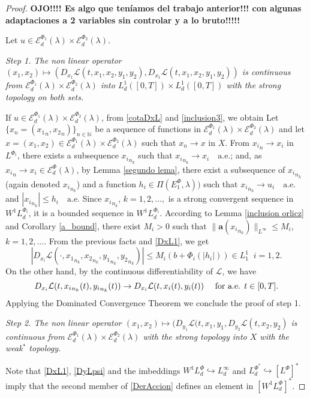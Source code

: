 \documentclass[twoside]{article}
\theoremstyle{remark}
\newcommand{\lphi}{L^{\Phi}}
\newcommand{\lphii}{L^{\Phi_i}}
\newcommand{\lpsi}{L^{\Phi^*}}
\newcommand{\ephi}{E^{\Phi}}
\newcommand{\wphi}{W^{1}\lphi}
\newcommand{\wphii}{W^{1}\lphii}
\newcommand{\domi}{\mathcal{E}^{\Phi}_d(\lambda)}
\newcommand{\domiuno}{\mathcal{E}^{\Phi_1}_d(\lambda)}
\newcommand{\domidos}{\mathcal{E}^{\Phi_2}_d(\lambda)}
\renewcommand{\b}[1]{\boldsymbol{#1}}
\renewcommand{\leq}{\leqslant}
\begin{document}
\begin{proof} 

{\bf OJO!!!! Es algo que ten\'iamos del trabajo anterior!!! 
con algunas adaptaciones a 2 variables sin controlar y a lo bruto!!!!!}

Let $u\in \domiuno\times\domidos$.

\noindent\emph{Step 1. The non linear operator  $(x_1,x_2) \mapsto (D_{x_1}\mathcal{L}(t,x_1,x_2,y_1,y_2),
D_{x_1}\mathcal{L}(t,x_1,x_2,y_1,y_2))$ is continuous from $\domiuno\times\domidos$ into $L^{1}_d([0,T])\times L^1_d([0,T])$ with the strong topology on both sets.} 


If $u\in \domiuno\times\domidos$, from \eqref{cotaDxL} and \eqref{inclusion3}, we obtain 
Let   $\{x_n=({x_1}_n,{x_2}_n)\}_{n\in \mathbb{N}}$ be a sequence of  functions in $\domiuno\times\domidos$  and let 
$x=(x_1,x_2)\in \domiuno\times\domidos$  such that $x_n\rightarrow x$ in $X$.
From  ${x_i}_n\rightarrow x_i$ in $\lphii$, there exists a subsequence ${x_i}_{n_k}$ such that ${x_i}_{n_k}\rightarrow x_i \quad\text{a.e.}$; and, as ${x_i}_n\rightarrow x_i \in\domi$, by 
  Lemma \ref{segundo lema}, there exist a subsequence of  ${x_i}_{n_k}$ (again denoted ${x_i}_{n_k}$) and a function  $h_i\in \Pi(\ephi_1,\lambda))$
such that  ${x_i}_{n_k}\rightarrow u_i \quad\text{a.e.}$ and $|{x_i}_{n_k}|\leq h_i\quad\text{a.e}$.  
Since ${x_i}_{n_k}$, $k=1,2,\ldots,$ is a strong convergent sequence in $\wphii_d$, it is a bounded sequence in $\wphii_d$. According to Lemma \ref{inclusion orlicz} and Corollary \ref{a_bound}, there exist $M_i>0$ such that $\|\b{a}({x_i}_{n_k})\|_{L^{\infty}} \leq M_i$, $k=1,2,\ldots$.  From the previous facts and \eqref{DxL1}, we get
\begin{equation*}\label{DxL1-bis}
|D_{x_i}\mathcal{L}(\cdot,{x_1}_{n_k},{x_2}_{n_k},{y_1}_{n_k},{y_2}_{n_k})|\leq 
M_i (b+\Phi_i(|h_i|)) \in L^1_1\;\;i=1,2.
\end{equation*}
On the other hand, by the continuous differentiability of $\mathcal{L}$, we have
\[D_{x_i}\mathcal{L}(t,{x_i}_{n_k}(t),{y_i}_{n_k}(t))\to D_{x_i}\mathcal{L}(t,x_i(t), y_i(t))\quad\hbox{ for a.e. } t\in[0,T].\]
Applying the Dominated Convergence Theorem we conclude the proof of step 1.

\noindent\emph{Step 2. The non linear operator   
$(x_1,x_2)\mapsto (D_{y_1}\mathcal{L}(t,x_1,y_1, D_{y_2}\mathcal{L}(t,x_2,y_2)$ is continuous from $\domiuno\times\domidos$ with the strong topology  into $X$  with the weak$^*$ topology.}


 Note that \eqref{DxL1},  \eqref{DyLpsi} and the imbeddings $\wphi_d \hookrightarrow L_d^{\infty}$ and  $\lpsi_d\hookrightarrow  \left[\lphi\right]^*$ imply that the second member of
\eqref{DerAccion} defines an element in $\left[\wphi_d\right]^*$.


\end{proof}
\end{document}
